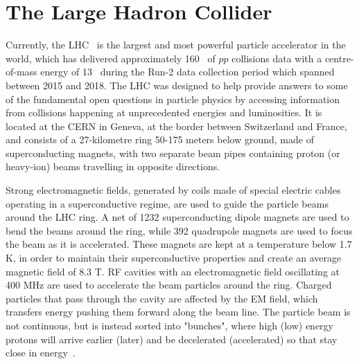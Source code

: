	\section{The Large Hadron Collider}
	\label{sec:lhc}
	Currently, the \ac{LHC}~\cite{LHCDesignReport} is the largest and most powerful particle accelerator in the world, which has delivered approximately 160 \infb\ of $pp$ collisions data with a centre-of-mass energy of 13 \tev\ during the Run-2 data collection period which spanned between 2015 and 2018.
	The \ac{LHC} was designed to help provide answers to some of the fundamental open questions in particle physics by accessing information from collisions happening at unprecedented energies and luminosities. 
	It is located at the \ac{CERN} in Geneva, at the border between Switzerland and France, and consists of a 27-kilometre ring 50-175 meters below ground, made of superconducting magnets, with two separate beam pipes containing proton (or heavy-ion) beams travelling in opposite directions. 
	
	Strong electromagnetic fields, generated by coils made of special electric cables operating in a superconductive regime, are used to guide the particle beams around the \ac{LHC} ring. A net of 1232 superconducting dipole magnets are used to bend the beams around the ring, while 392 quadrupole magnets are used to focus the beam as it is accelerated. These magnets are kept at a temperature below 1.7 K, in order to maintain their superconductive properties and create an average magnetic field of 8.3 T. 
	\ac{RF} cavities with an electromagnetic field oscillating at 400 MHz are used to accelerate the beam particles around the ring. 
	Charged particles that pass through the cavity are affected by the \ac{EM} field, which transfers energy pushing them forward along the beam line.  
	The particle beam is not continuous, but is instead sorted into "bunches", where high (low) energy protons will arrive earlier (later) and be decelerated (accelerated) so that stay close in energy~\cite{Wille:560708}.
	
